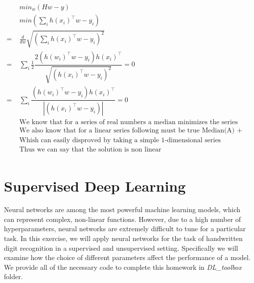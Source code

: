 \documentclass[english]{article}
\begin{document}
\begin{enumerate}
\begin{align*}
	&\; min_w (Hw - y) \\
	&\; min \left( \sum\limits_i h(x_i)^\top w - y_i \right) \\
	=&\; \frac{d}{dw} \sqrt{\left( \sum\limits_i h(x_i)^\top w - y_i \right) ^ 2} \\
	=&\; \sum\limits_i \frac{1}{2} \dfrac{2 (h(w_i)^\top w - y_i) h(x_i)^\top}
						     {\sqrt{(h(x_i)^\top w - y_i) ^ 2}} = 0\\
	=&\; \sum\limits_i \dfrac{(h(w_i)^\top w - y_i) h(x_i)^\top}
				       {|(h(x_i)^\top w - y_i)|} = 0\\
	&\;\text{We know that for a series of real numbers a median minimizes the series} \\
	&\;\text{We also know that for a linear series following must be true Median(A) + Median(B) = Median(A+B)} \\
	&\;\text {Whish can easily disproved by taking a simple 1-dimensional series}\\
	&\;\text{Thus we can say that the solution is non linear} \\
\end{align*}
  

\end{enumerate}
  
\section{Supervised Deep Learning}
\label{sec:sdl}

Neural networks are among the most powerful machine learning models, which can represent complex, non-linear functions. However, due to a high number of hyperparameters, neural networks are extremely difficult to tune for a particular task. In this exercise, we will apply neural networks for the task of handwritten digit recognition in a supervised and unsupervised setting. Specifically we will examine how the choice of different parameters affect the performance of a model. We provide all of the necessary code to complete this homework in \textit{DL\_toolbox} folder.


\bigskip
\end{document}
